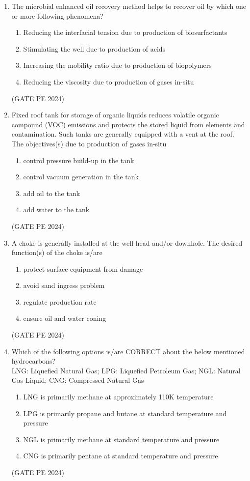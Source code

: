 \documentclass[journal,12pt,onecolumn]{IEEEtran}
\theoremstyle{remark}
\begin{document}
\begin{enumerate}
\item The microbial enhanced oil recovery method helps to recover oil by which one or more following phenomena?
\begin{enumerate}
    \item Reducing the interfacial tension due to production of biosurfactants
    \item Stimulating the well due to production of acids
    \item Increasing the mobility ratio due to production of biopolymers
    \item Reducing the viscosity due to production of gases in-situ
\end{enumerate}
\hfill{(GATE PE 2024)}

\item Fixed roof tank for storage of organic liquids reduces volatile organic compound (VOC) emissions and protects the stored liquid from elements and contamination. Such tanks are generally equipped with a vent at the roof.\\
The objectives(s) due to production of gases in-situ
\begin{enumerate}
    \item control pressure build-up in the tank
    \item control vacuum generation in the tank
    \item add oil to the tank
    \item add water to the tank
\end{enumerate}
\hfill{(GATE PE 2024)}

\item A choke is generally installed at the well head and/or downhole. The desired function(s) of the choke is/are
\begin{enumerate}
    \item protect surface equipment from damage
    \item avoid sand ingress problem
    \item regulate production rate
    \item ensure oil and water coning
\end{enumerate}
\hfill{(GATE PE 2024)}

\item Which of the following options is/are CORRECT about the below mentioned hydrocarbons?\\
LNG: Liquefied Natural Gas; LPG: Liquefied Petroleum Gas; NGL: Natural Gas Liquid; CNG: Compressed Natural Gas
\begin{enumerate}
    \item LNG is primarily methane at approximately 110K temperature
    \item LPG is primarily propane and butane at standard temperature and pressure
    \item NGL is primarily methane at standard temperature and pressure
    \item CNG is primarily pentane at standard temperature and pressure
\end{enumerate}
\hfill{(GATE PE 2024)}


\end{enumerate}
\end{document}
